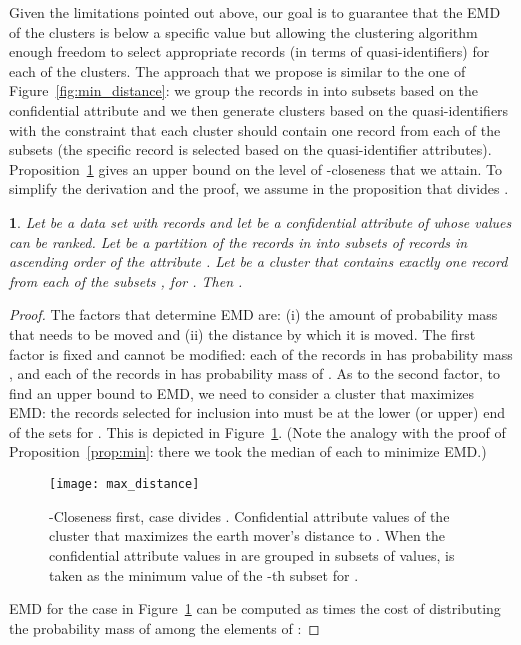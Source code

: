 \documentclass[10pt,journal,compsoc]{IEEEtran}
\theoremstyle{definition}
\theoremstyle{plain}
\newtheorem{prop}{\protect\propositionname}
\providecommand{\propositionname}{Proposition}
\begin{document}
Given the limitations pointed out above, our goal is to guarantee
that the EMD of the clusters is below a specific value but allowing
the clustering algorithm enough freedom to select appropriate records
(in terms of quasi-identifiers) for each of the clusters. The approach
that we propose is similar to the one of Figure~\ref{fig:min_distance}:
we group the records in  into  subsets based on the confidential
attribute and we then generate clusters based on
the quasi-identifiers with the constraint that each 
cluster should contain one record
from each of the  subsets (the specific record is selected based on
the quasi-identifier attributes). Proposition~\ref{prop:upper_bound}
gives an upper bound on the level of -closeness that we attain.
To simplify the derivation and 
the proof, we assume in the proposition that  divides .
\begin{prop}
	\label{prop:upper_bound}Let  be a data set with  records
and let  be a confidential 
attribute of  whose values can be ranked. 
Let 
	be a partition of the records in  into  subsets of 
	records in ascending order of the attribute . Let  be a
	cluster that contains exactly one record from each of the 
subsets , for .
	Then .\end{prop}
\begin{proof}
The factors that determine EMD are: (i) the amount of probability
	mass that needs to be moved and (ii) the distance by which it is
moved. The first factor
	is fixed and cannot be modified: each of the records in  has probability
	mass , and each of the records in  has probability mass
	of . As to the second factor, to find an upper bound to 
	EMD, we need to consider a cluster  that maximizes EMD: the
	records selected for inclusion 
into  must be at the lower (or upper) end 
	of the sets  for . 
This is depicted in Figure~\ref{fig:max_distance}.
(Note the analogy with the proof of Proposition~\ref{prop:min}: there we 
took the median of each  to minimize EMD.)
	
	\begin{figure}[!t]
		\begin{centering}
			\texttt{[image: max\_distance]}
			
			\par\end{centering}
		\hfil
\protect\caption{-Closeness first, case  divides . Confidential attribute values 
			of the cluster  that maximizes the earth mover's distance to . 
When the confidential
			attribute values in  are grouped in  subsets of  values,  is taken as the minimum value of the -th subset for 
.  \label{fig:max_distance}}
	\end{figure}
	
	EMD for the case in Figure~\ref{fig:max_distance} can be computed
	as  times the cost of distributing the probability mass of 
	among the  elements of :

\end{proof}
\end{document}
